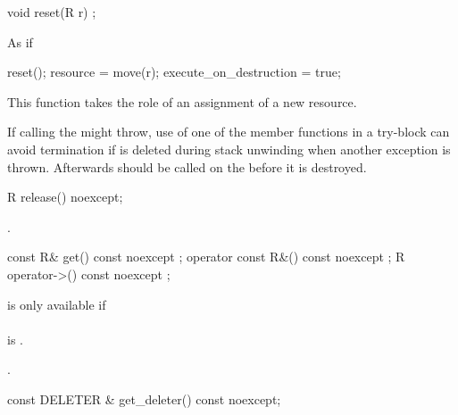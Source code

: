 \documentclass[ebook,11pt,article]{memoir}
\begin{document}
\begin{itemdecl}
void reset(R r) ;
\end{itemdecl}

\pnum
\effects As if
\begin{codeblock}
  reset();
  resource = move(r);
  execute_on_destruction = true;
\end{codeblock}


\pnum
\enternote This function takes the role of an assignment of a new resource.
\exitnote

\pnum
\enternote If calling the  might throw, use of one of the  member functions in a try-block can avoid termination if  is deleted during stack unwinding when another exception is thrown. Afterwards  should be called on the  before it is destroyed.
\exitnote

\begin{itemdecl}
R release() noexcept;
\end{itemdecl}

\pnum
\effects {}.

\pnum
\returns {}

\begin{itemdecl}
const R& get() const noexcept ;
operator const R&() const noexcept ;
R operator->() const noexcept ;
\end{itemdecl}

\pnum
\requires {} is only available if \\
\\ is . 

\pnum
\returns {}.

\begin{itemdecl}
const DELETER & get_deleter() const noexcept;
\end{itemdecl}

\pnum
\returns {}
\end{document}
